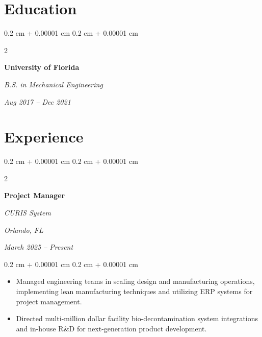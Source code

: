 \documentclass[10pt, letterpaper]{article}
\newenvironment{highlights}{
    \begin{itemize}[
        topsep=0.10 cm,
        parsep=0.10 cm,
        partopsep=0pt,
        itemsep=0pt,
        leftmargin=0.4 cm + 10pt
    ]
}{
    \end{itemize}
} %
\newenvironment{onecolentry}{
    \begin{adjustwidth}{
        0.2 cm + 0.00001 cm
    }{
        0.2 cm + 0.00001 cm
    }
}{
    \end{adjustwidth}
} %
\newenvironment{twocolentry}[2][]{
    \onecolentry
    \def\secondColumn{#2}
    \setcolumnwidth{\fill, 4.5 cm}
    \begin{paracol}{2}
}{
    \switchcolumn \raggedleft \secondColumn
    \end{paracol}
    \endonecolentry
} %
\begin{document}
        \vspace{0.3 cm}


    

    \section{Education}


\vspace{0.2 cm}
        
        \begin{twocolentry}{
            
            
        \textit{Aug 2017 – Dec 2021}}
            \textbf{University of Florida}
            
            \textit{B.S. in Mechanical Engineering}
        \end{twocolentry}

        \vspace{0.15 cm}
        

\vspace{0.3 cm}

    
    \section{Experience}

        \vspace{0.2 cm}

        \begin{twocolentry}{
        \textit{Orlando, FL}    
            
        \textit{March 2025 – Present}}
            \textbf{Project Manager}
            
            \textit{CURIS System}
        \end{twocolentry}

        \vspace{0.10 cm}
        \begin{onecolentry}
            \begin{highlights}
                \item Managed engineering teams in scaling design and manufacturing operations, implementing lean manufacturing techniques and utilizing ERP systems for project management.
                \item Directed multi-million dollar facility bio-decontamination system integrations and in-house R\&D for next-generation product development.
            \end{highlights}
        \end{onecolentry}
\end{document}
